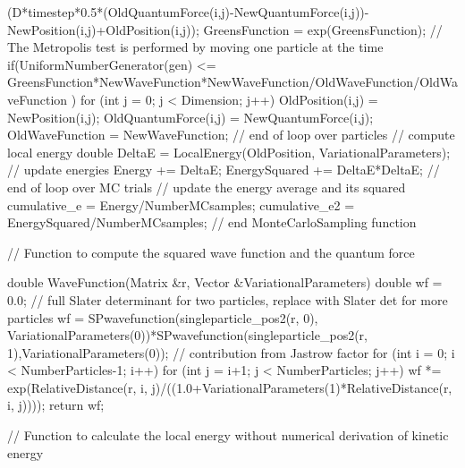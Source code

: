 \documentclass[%
oneside,                 %
final,                   %
10pt]{article}
\begin{document}
{{{{	  (D*timestep*0.5*(OldQuantumForce(i,j)-NewQuantumForce(i,j))-NewPosition(i,j)+OldPosition(i,j));
      }
      GreensFunction = exp(GreensFunction);
      // The Metropolis test is performed by moving one particle at the time
      if(UniformNumberGenerator(gen) <= GreensFunction*NewWaveFunction*NewWaveFunction/OldWaveFunction/OldWaveFunction ) { 
	for (int  j = 0; j < Dimension; j++) {
	  OldPosition(i,j) = NewPosition(i,j);
	  OldQuantumForce(i,j) = NewQuantumForce(i,j);
	}
	OldWaveFunction = NewWaveFunction;
      }
    }  //  end of loop over particles
    // compute local energy  
    double DeltaE = LocalEnergy(OldPosition, VariationalParameters);
    // update energies
    Energy += DeltaE;
    EnergySquared += DeltaE*DeltaE;
  }   // end of loop over MC trials   
  // update the energy average and its squared 
  cumulative_e = Energy/NumberMCsamples;
  cumulative_e2 = EnergySquared/NumberMCsamples;
}   // end MonteCarloSampling function  


// Function to compute the squared wave function and the quantum force

double  WaveFunction(Matrix &r, Vector &VariationalParameters)
{
  double wf = 0.0;
  // full Slater determinant for two particles, replace with Slater det for more particles 
  wf  = SPwavefunction(singleparticle_pos2(r, 0), VariationalParameters(0))*SPwavefunction(singleparticle_pos2(r, 1),VariationalParameters(0));
  // contribution from Jastrow factor
  for (int i = 0; i < NumberParticles-1; i++) { 
    for (int j = i+1; j < NumberParticles; j++) {
      wf *= exp(RelativeDistance(r, i, j)/((1.0+VariationalParameters(1)*RelativeDistance(r, i, j))));
    }
  }
  return wf;
}

// Function to calculate the local energy without numerical derivation of kinetic energy
\end{document}
